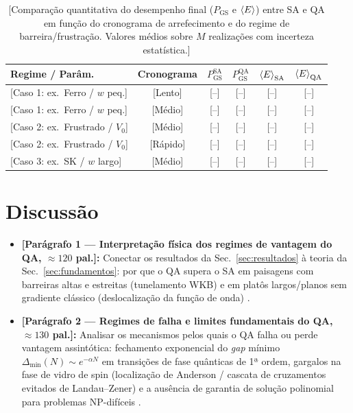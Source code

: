\documentclass[aps,pre,twocolumn,10pt,superscriptaddress,nofootinbib]{revtex4-2}
\begin{document}
\begin{table}[t]
  \centering
  \caption{[Comparação quantitativa do desempenho final ($P_{\text{GS}}$ e $\ev{E}$) entre SA e QA em função do cronograma de arrefecimento e do regime de barreira/frustração. Valores médios sobre $M$ realizações com incerteza estatística.]}
  \label{tab:comparativo}
  \footnotesize
  \begin{tabular}{@{}lccccc@{}}
    \toprule
    Regime / Parâm. & Cronograma & $P_{\text{GS}}^{\text{SA}}$ & $P_{\text{GS}}^{\text{QA}}$ & $\ev{E}_{\text{SA}}$ & $\ev{E}_{\text{QA}}$ \\
    \midrule
    {[Caso 1: ex.\ Ferro / $w$ peq.]}   & {[Lento]}  & {[--]} & {[--]} & {[--]} & {[--]} \\
    {[Caso 1: ex.\ Ferro / $w$ peq.]}   & {[Médio]}  & {[--]} & {[--]} & {[--]} & {[--]} \\
    {[Caso 2: ex.\ Frustrado / $V_0$]}  & {[Médio]}  & {[--]} & {[--]} & {[--]} & {[--]} \\
    {[Caso 2: ex.\ Frustrado / $V_0$]}  & {[Rápido]} & {[--]} & {[--]} & {[--]} & {[--]} \\
    {[Caso 3: ex.\ SK / $w$ largo]}     & {[Médio]}  & {[--]} & {[--]} & {[--]} & {[--]} \\
    \bottomrule
  \end{tabular}
\end{table}

\section{Discussão}
\label{sec:discussao}

\begin{itemize}
  \item \textbf{[Parágrafo 1 --- Interpretação física dos regimes de vantagem do QA, $\approx 120$ pal.]:}
        Conectar os resultados da Sec.~\ref{sec:resultados} à teoria da Sec.~\ref{sec:fundamentos}: por que o QA supera o SA em paisagens com barreiras altas e estreitas (tunelamento WKB) e em platôs largos/planos sem gradiente clássico (deslocalização da função de onda) \cite{Kadowaki1998,Das2008,Chakrabarti2022}.
  \item \textbf{[Parágrafo 2 --- Regimes de falha e limites fundamentais do QA, $\approx 130$ pal.]:}
        Analisar os mecanismos pelos quais o QA falha ou perde vantagem assintótica: fechamento exponencial do \emph{gap} mínimo $\Delta_{\min}(N) \sim e^{-\alpha N}$ em transições de fase quânticas de 1ª ordem, gargalos na fase de vidro de spin (localização de Anderson / cascata de cruzamentos evitados de Landau--Zener) e a ausência de garantia de solução polinomial para problemas NP-difíceis \cite{Das2008,Albash2018,Chakrabarti2022}.
\end{itemize}
\end{document}
